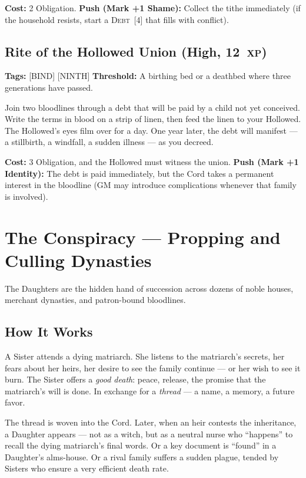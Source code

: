 \documentclass[10pt,twoside]{book}
\newcommand{\xp}[1]{#1~\textsc{xp}}
\newcommand{\timer}[2]{\textsc{#1}~[#2]}
\begin{document}
\textbf{Cost:} 2 Obligation. \textbf{Push (Mark +1 Shame):} Collect the tithe immediately (if the household resists, start a \timer{Debt}{4} that fills with conflict).

\section{Rite of the Hollowed Union (High, \xp{12})}
\textbf{Tags:} [BIND] [NINTH] \quad \textbf{Threshold:} A birthing bed or a deathbed where three generations have passed.

Join two bloodlines through a debt that will be paid by a child not yet conceived. Write the terms in blood on a strip of linen, then feed the linen to your Hollowed. The Hollowed's eyes film over for a day. One year later, the debt will manifest --- a stillbirth, a windfall, a sudden illness --- as you decreed.

\textbf{Cost:} 3 Obligation, and the Hollowed must witness the union. \textbf{Push (Mark +1 Identity):} The debt is paid immediately, but the Cord takes a permanent interest in the bloodline (GM may introduce complications whenever that family is involved).

\chapter{The Conspiracy --- Propping and Culling Dynasties}

The Daughters are the hidden hand of succession across dozens of noble houses, merchant dynasties, and patron-bound bloodlines.

\section{How It Works}

A Sister attends a dying matriarch. She listens to the matriarch's secrets, her fears about her heirs, her desire to see the family continue --- or her wish to see it burn. The Sister offers a \textit{good death}: peace, release, the promise that the matriarch's will is done. In exchange for a \textit{thread} --- a name, a memory, a future favor.

The thread is woven into the Cord. Later, when an heir contests the inheritance, a Daughter appears --- not as a witch, but as a neutral nurse who ``happens'' to recall the dying matriarch's final words. Or a key document is ``found'' in a Daughter's alms-house. Or a rival family suffers a sudden plague, tended by Sisters who ensure a very efficient death rate.
\end{document}
